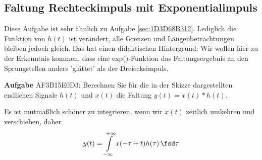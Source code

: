\clearpage
\subsection{Faltung Rechteckimpuls mit Exponentialimpuls}
\label{sec:AF3B15E0D3}
\begin{Ziel}
Diese Aufgabe ist sehr ähnlich zu Aufgabe \ref{sec:1D3D68B312}.
Lediglich die Funktion von $h(t)$ ist verändert, alle Grenzen und
Längenbetrachtungen bleiben jedoch gleich. Das hat einen didaktischen
Hintergrund: Wir wollen hier zu der Erkenntnis kommen, dass eine exp()-Funktion
das Faltungsergebnis an den Sprungstellen anders 'glättet' als der Dreiecksimpuls.
\end{Ziel}
\textbf{Aufgabe} {\tiny AF3B15E0D3}: Berechnen Sie für die in der Skizze dargestellten
endlichen Signale $h(t)$ und $x(t)$ die Faltung $y(t)=x(t) \ast h(t)$.




\begin{Werkzeug}
Es ist mutmaßlich schöner zu integrieren, wenn wir $x(t)$ zeitlich umkehren und
verschieben, daher
\begin{equation}
y(t) = \int\limits_{-\infty}^{+\infty} x(-\tau+t) h(\tau) \, \fsd \tau
\end{equation}
\end{Werkzeug}


